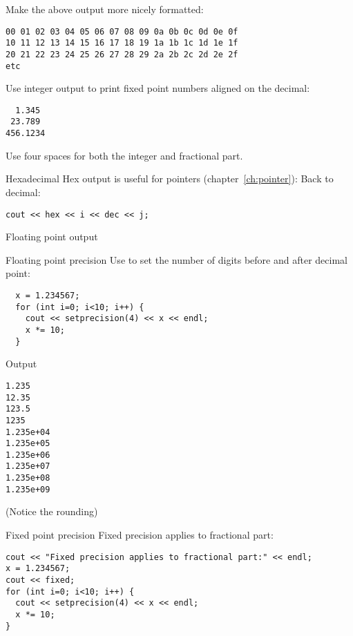 \begin{exercise}
  \label{ex:leadzero}
  Make the above output more nicely formatted:
\begin{verbatim}
00 01 02 03 04 05 06 07 08 09 0a 0b 0c 0d 0e 0f 
10 11 12 13 14 15 16 17 18 19 1a 1b 1c 1d 1e 1f 
20 21 22 23 24 25 26 27 28 29 2a 2b 2c 2d 2e 2f 
etc
\end{verbatim}
\end{exercise}

\begin{exercise}
  \label{ex:fixedpout}
  Use integer output to print fixed point numbers aligned on the
  decimal:
\begin{verbatim}
  1.345
 23.789
456.1234
\end{verbatim}
  Use four spaces for both the integer and fractional part.
\end{exercise}

\begin{block}{Hexadecimal}
  \label{sl:io-hex}
  Hex output is useful for pointers (chapter~\ref{ch:pointer}):
  Back to decimal:
\begin{verbatim}
cout << hex << i << dec << j;
\end{verbatim}
\end{block}

 {Floating point output}

\begin{block}{Floating point precision}
  \label{sl:io-float}
  Use  to set the number of digits before and after
  decimal point:
\begin{verbatim}
  x = 1.234567;
  for (int i=0; i<10; i++) {
    cout << setprecision(4) << x << endl;
    x *= 10;
  }
\end{verbatim}
\end{block}

\begin{block}{Output}
  \label{sl:io-float-out}
\begin{verbatim}
1.235
12.35
123.5
1235
1.235e+04
1.235e+05
1.235e+06
1.235e+07
1.235e+08
1.235e+09
\end{verbatim}
(Notice the rounding)
\end{block}

\begin{block}{Fixed point precision}
  \label{sl:io-fix}
  Fixed precision applies to fractional part:
\begin{verbatim}
cout << "Fixed precision applies to fractional part:" << endl;
x = 1.234567;
cout << fixed;
for (int i=0; i<10; i++) {
  cout << setprecision(4) << x << endl;
  x *= 10;
}
\end{verbatim}
\end{block}

